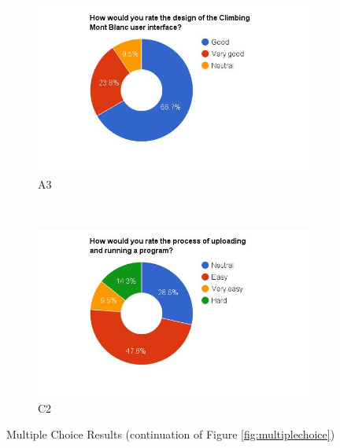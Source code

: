 \begin{figure}
    \begin{subfigure}[h]{0.48\textwidth}
        \centerline{\includegraphics[width=1.5\textwidth]{results/design_cmb.jpg}}
        \caption{A3}
        \label{fig:cmb-design}
    \end{subfigure}
    ~ %
    \hfill
    \begin{subfigure}[h]{0.48\textwidth}
        \centerline{\includegraphics[width=1.5\textwidth]{results/submission_cmb.jpg}}
        \caption{C2}
        \label{fig:cmb-submission}
    \end{subfigure}
    \caption{Multiple Choice Results (continuation of Figure \ref{fig:multiplechoice})}
    \label{fig:multiplechoice1}
\end{figure}

